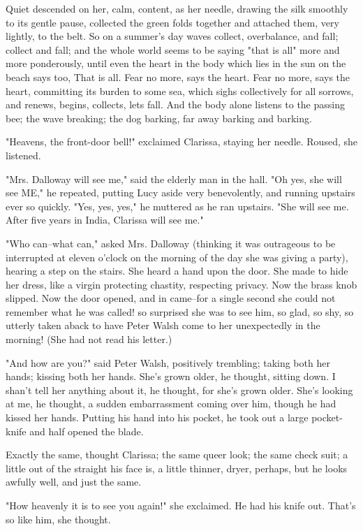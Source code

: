 \documentclass[lang=cn,10pt]{elegantbook}
\begin{document}
Quiet descended on her, calm, content, as her needle, drawing the
silk smoothly to its gentle pause, collected the green folds
together and attached them, very lightly, to the belt.  So on a
summer's day waves collect, overbalance, and fall; collect and
fall; and the whole world seems to be saying "that is all" more and
more ponderously, until even the heart in the body which lies in
the sun on the beach says too, That is all.  Fear no more, says the
heart.  Fear no more, says the heart, committing its burden to some
sea, which sighs collectively for all sorrows, and renews, begins,
collects, lets fall.  And the body alone listens to the passing
bee; the wave breaking; the dog barking, far away barking and
barking.

"Heavens, the front-door bell!" exclaimed Clarissa, staying her
needle.  Roused, she listened.

"Mrs. Dalloway will see me," said the elderly man in the hall.  "Oh
yes, she will see ME," he repeated, putting Lucy aside very
benevolently, and running upstairs ever so quickly.  "Yes, yes,
yes," he muttered as he ran upstairs.  "She will see me.  After
five years in India, Clarissa will see me."

"Who can--what can," asked Mrs. Dalloway (thinking it was
outrageous to be interrupted at eleven o'clock on the morning of
the day she was giving a party), hearing a step on the stairs.  She
heard a hand upon the door.  She made to hide her dress, like a
virgin protecting chastity, respecting privacy.  Now the brass knob
slipped.  Now the door opened, and in came--for a single second she
could not remember what he was called! so surprised she was to see
him, so glad, so shy, so utterly taken aback to have Peter Walsh
come to her unexpectedly in the morning!  (She had not read his
letter.)

"And how are you?" said Peter Walsh, positively trembling; taking
both her hands; kissing both her hands.  She's grown older, he
thought, sitting down.  I shan't tell her anything about it, he
thought, for she's grown older.  She's looking at me, he thought,
a sudden embarrassment coming over him, though he had kissed her
hands.  Putting his hand into his pocket, he took out a large
pocket-knife and half opened the blade.

Exactly the same, thought Clarissa; the same queer look; the same
check suit; a little out of the straight his face is, a little
thinner, dryer, perhaps, but he looks awfully well, and just the
same.

"How heavenly it is to see you again!" she exclaimed.  He had his
knife out.  That's so like him, she thought.
\end{document}
